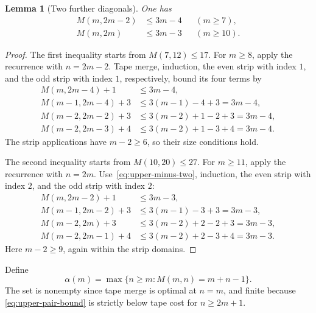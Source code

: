 \documentclass[11pt]{article}
\newtheorem{lemma}[theorem]{Lemma}
\theoremstyle{definition}
\theoremstyle{remark}
\begin{document}
\begin{lemma}[Two further diagonals]\label{lem:upper-two-diagonals}
One has
\begin{align}
 M(m,2m-2)&\le3m-4 &&(m\ge7),\label{eq:upper-minus-two}\\
 M(m,2m)&\le3m-3 &&(m\ge10).\label{eq:upper-zero}
\end{align}
\end{lemma}
\begin{proof}
The first inequality starts from $M(7,12)\le17$.
For $m\ge8$, apply the recurrence with $n=2m-2$.
Tape merge, induction, the even strip with index $1$, and the odd strip
with index $1$, respectively, bound its four terms by
\[
\begin{split}
 M(m,2m-4)+1&\le3m-4,\\
 M(m-1,2m-4)+3&\le3(m-1)-4+3=3m-4,\\
 M(m-2,2m-2)+3&\le3(m-2)+1-2+3=3m-4,\\
 M(m-2,2m-3)+4&\le3(m-2)+1-3+4=3m-4.
\end{split}
\]
The strip applications have $m-2\ge6$, so their size conditions hold.

The second inequality starts from $M(10,20)\le27$.
For $m\ge11$, apply the recurrence with $n=2m$.
Use~\eqref{eq:upper-minus-two}, induction, the even strip with index $2$,
and the odd strip with index $2$:
\[
\begin{split}
 M(m,2m-2)+1&\le3m-3,\\
 M(m-1,2m-2)+3&\le3(m-1)-3+3=3m-3,\\
 M(m-2,2m)+3&\le3(m-2)+2-2+3=3m-3,\\
 M(m-2,2m-1)+4&\le3(m-2)+2-3+4=3m-3.
\end{split}
\]
Here $m-2\ge9$, again within the strip domains.
\end{proof}

Define
\[
 \alpha(m)=\max\{n\ge m:M(m,n)=m+n-1\}.
\]
The set is nonempty since tape merge is optimal at $n=m$, and finite
because \eqref{eq:upper-pair-bound} is strictly below tape cost for $n\ge2m+1$.
\end{document}

